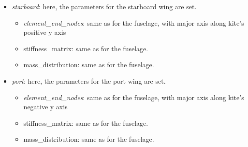 \documentclass[report]{nrel}
\begin{document}
\begin{itemize}
\begin{itemize}
			\item \emph{starboard}: here, the parameters for the starboard wing are set.
			\begin{itemize}
				\item \emph{element\_end\_nodes}: same as for the fuselage, with major axis along kite's positive y axis
				\item {stiffness\_matrix}: same as for the fuselage.
				\item {mass\_distribution}: same as for the fuselage.
			\end{itemize}
			\item \emph{port}: here, the parameters for the port wing are set.
			\begin{itemize}
				\item \emph{element\_end\_nodes}: same as for the fuselage, with major axis along kite's negative y axis
				\item {stiffness\_matrix}: same as for the fuselage.
				\item {mass\_distribution}: same as for the fuselage.
			\end{itemize}
		\end{itemize}


\end{itemize}
\end{document}
